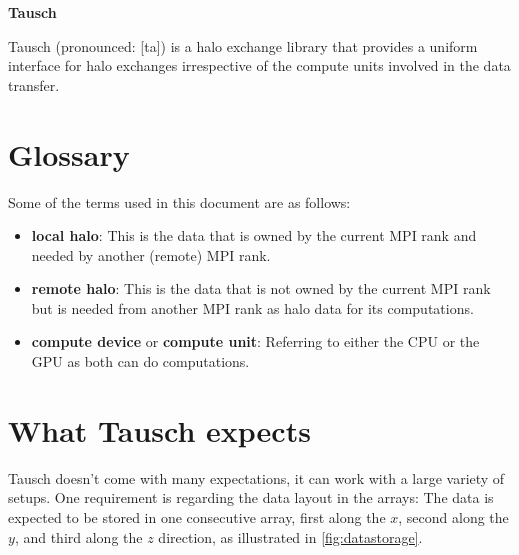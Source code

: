 \documentclass{article}
\begin{document}

\begin{center}\Huge\bfseries
    Tausch
\end{center}


Tausch (pronounced: [ta\textupsilon\textesh]) is a halo exchange library that provides a uniform interface for halo exchanges irrespective of the compute units involved in the data transfer.

\section{Glossary}

Some of the terms used in this document are as follows:
\begin{itemize}
    \item \textbf{local halo}: This is the data that is owned by the current MPI rank and needed by another (remote) MPI rank.
    \item \textbf{remote halo}: This is the data that is not owned by the current MPI rank but is needed from another MPI rank as halo data for its computations.
    \item \textbf{compute device} or \textbf{compute unit}: Referring to either the CPU or the GPU as both can do computations.
\end{itemize}

\section{What Tausch expects}

Tausch doesn't come with many expectations, it can work with a large variety of setups. One requirement is regarding the data layout in the arrays: The data is expected to be stored in one consecutive array, first along the $x$, second along the $y$, and third along the $z$ direction, as illustrated in \autoref{fig:datastorage}.
\end{document}
